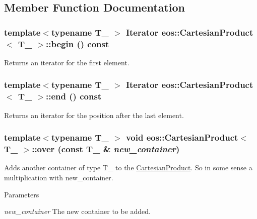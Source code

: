 \subsection{Member Function Documentation}
\hypertarget{classeos_1_1CartesianProduct_a34cc259ef3e5c9e0773e816449787abd}{
\subsubsection[{begin}]{\setlength{\rightskip}{0pt plus 5cm}template$<$typename T\_\- $>$ {\bf Iterator} {\bf eos::CartesianProduct}$<$ T\_\- $>$::begin () const}}
\label{classeos_1_1CartesianProduct_a34cc259ef3e5c9e0773e816449787abd}
Returns an iterator for the first element. \hypertarget{classeos_1_1CartesianProduct_a7c37fe657fc7d312ae482ab581d3392f}{
\subsubsection[{end}]{\setlength{\rightskip}{0pt plus 5cm}template$<$typename T\_\- $>$ {\bf Iterator} {\bf eos::CartesianProduct}$<$ T\_\- $>$::end () const}}
\label{classeos_1_1CartesianProduct_a7c37fe657fc7d312ae482ab581d3392f}
Returns an iterator for the position after the last element. \hypertarget{classeos_1_1CartesianProduct_adef1565dbec35aab631423ade5b1baf0}{
\subsubsection[{over}]{\setlength{\rightskip}{0pt plus 5cm}template$<$typename T\_\- $>$ void {\bf eos::CartesianProduct}$<$ T\_\- $>$::over (const T\_\- \& {\em new\_\-container})}}
\label{classeos_1_1CartesianProduct_adef1565dbec35aab631423ade5b1baf0}
Adds another container of type T\_\- to the \hyperlink{classeos_1_1CartesianProduct}{CartesianProduct}. So in some sense a multiplication with new\_\-container. 
\begin{DoxyParams}{Parameters}
\item[{\em new\_\-container}]The new container to be added. \end{DoxyParams}
